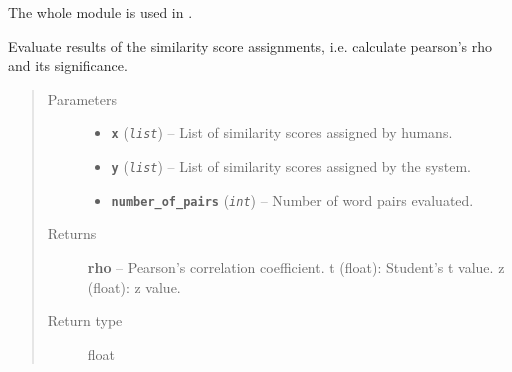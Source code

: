 \documentclass[letterpaper,10pt,english]{sphinxmanual}
\begin{document}
The whole module is used in .

\begin{fulllineitems}
\label{src.eval:src.eval.word_similarity.evaluate_wordpair_sims}
Evaluate results of the similarity score assignments, i.e. calculate pearson's rho and its significance.
\begin{quote}\begin{description}
\item[{Parameters}] \leavevmode\begin{itemize}
\item {} 
\textbf{\texttt{x}} (\emph{\texttt{list}}) -- List of similarity scores assigned by humans.

\item {} 
\textbf{\texttt{y}} (\emph{\texttt{list}}) -- List of similarity scores assigned by the system.

\item {} 
\textbf{\texttt{number\_of\_pairs}} (\emph{\texttt{int}}) -- Number of word pairs evaluated.

\end{itemize}

\item[{Returns}] \leavevmode
\textbf{rho} -- Pearson's correlation coefficient.
t (float): Student's t value.
z (float): z value.

\item[{Return type}] \leavevmode
float

\end{description}\end{quote}

\end{fulllineitems}

\end{document}
